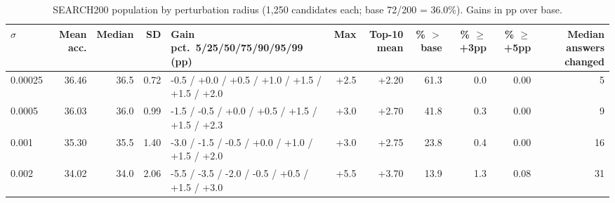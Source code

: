\begin{table}[t]
\centering
\small
\begin{adjustbox}{max width=\linewidth}
\begin{tabular}{lrrrlrrrrrr}
\toprule
$\sigma$ & Mean acc. & Median & SD & Gain pct.\ 5/25/50/75/90/95/99 (pp) & Max & Top-10 mean & \% $>$base & \% $\ge$+3pp & \% $\ge$+5pp & Median answers changed \\
\midrule
0.00025 & 36.46 & 36.5 & 0.72 & -0.5 / +0.0 / +0.5 / +1.0 / +1.5 / +1.5 / +2.0 & +2.5 & +2.20 & 61.3 & 0.0 & 0.00 & 5 \\
0.0005 & 36.03 & 36.0 & 0.99 & -1.5 / -0.5 / +0.0 / +0.5 / +1.5 / +1.5 / +2.3 & +3.0 & +2.70 & 41.8 & 0.3 & 0.00 & 9 \\
0.001 & 35.30 & 35.5 & 1.40 & -3.0 / -1.5 / -0.5 / +0.0 / +1.0 / +1.5 / +2.0 & +3.0 & +2.75 & 23.8 & 0.4 & 0.00 & 16 \\
0.002 & 34.02 & 34.0 & 2.06 & -5.5 / -3.5 / -2.0 / -0.5 / +0.5 / +1.5 / +3.0 & +5.5 & +3.70 & 13.9 & 1.3 & 0.08 & 31 \\
\bottomrule
\end{tabular}
\end{adjustbox}
\caption{SEARCH200 population by perturbation radius (1,250 candidates each; base 72/200 = 36.0\%). Gains in pp over base.}
\label{tab:radius-population}
\end{table}

